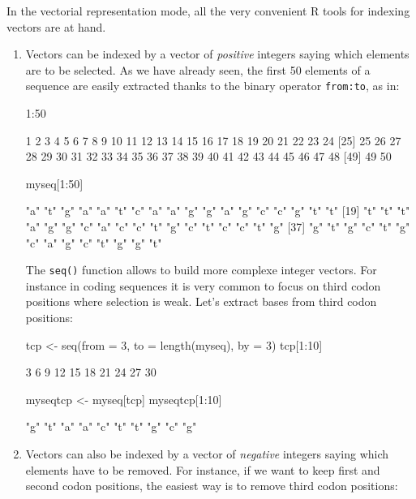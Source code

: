 \documentclass{article}
\begin{document}
In the vectorial representation mode, all the very convenient R tools for indexing vectors
are at hand.
\begin{enumerate}
\item Vectors can be indexed by a vector of \emph{positive} integers saying which
elements are to be selected. As we have already seen, the first 50 elements of a sequence
are easily extracted thanks to the binary operator \texttt{from:to}, as in:

\begin{Schunk}
\begin{Sinput}
 1:50
\end{Sinput}
\begin{Soutput}
 [1]  1  2  3  4  5  6  7  8  9 10 11 12 13 14 15 16 17 18 19 20 21 22 23 24
[25] 25 26 27 28 29 30 31 32 33 34 35 36 37 38 39 40 41 42 43 44 45 46 47 48
[49] 49 50
\end{Soutput}
\begin{Sinput}
 myseq[1:50]
\end{Sinput}
\begin{Soutput}
 [1] "a" "t" "g" "a" "a" "t" "c" "a" "a" "g" "g" "a" "g" "c" "c" "g" "t" "t"
[19] "t" "t" "t" "a" "g" "g" "c" "a" "c" "c" "t" "g" "c" "t" "c" "c" "t" "g"
[37] "g" "t" "g" "c" "t" "g" "c" "a" "g" "c" "t" "g" "g" "t"
\end{Soutput}
\end{Schunk}

The \texttt{seq()} function allows to build more complexe integer vectors. For instance
in coding sequences it is very common to focus on third codon positions where
selection is weak. Let's extract bases from third codon positions:

\begin{Schunk}
\begin{Sinput}
 tcp <- seq(from = 3, to = length(myseq), by = 3)
 tcp[1:10]
\end{Sinput}
\begin{Soutput}
 [1]  3  6  9 12 15 18 21 24 27 30
\end{Soutput}
\begin{Sinput}
 myseqtcp <- myseq[tcp]
 myseqtcp[1:10]
\end{Sinput}
\begin{Soutput}
 [1] "g" "t" "a" "a" "c" "t" "t" "g" "c" "g"
\end{Soutput}
\end{Schunk}
 
 \item Vectors can also be indexed by a vector of \emph{negative} integers saying which
elements have to be removed. For instance, if we want to keep first and second codon positions,
the easiest way is to remove third codon positions:


\end{enumerate}
\end{document}
